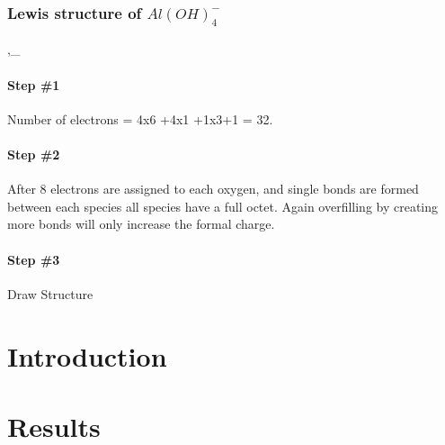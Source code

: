 \documentclass[]{article}
\let\oldparagraph\paragraph
\renewcommand{\paragraph}[1]{\oldparagraph{#1}\mbox{}}
\begin{document}
\hypertarget{lewis-structure-of-aloh_4--}{%
\subsubsection{\texorpdfstring{Lewis structure of
\(Al(OH)_4 ^{-}\)}{Lewis structure of Al(OH)\_4 \^{}\{-\}}}\label{lewis-structure-of-aloh_4--}}

,\_

\hypertarget{step-1-1}{%
\paragraph{Step \#1}\label{step-1-1}}

Number of electrons = 4x6 +4x1 +1x3+1 = 32.

\hypertarget{step-2-1}{%
\paragraph{Step \#2}\label{step-2-1}}

After 8 electrons are assigned to each oxygen, and single bonds are
formed between each species all species have a full octet. Again
overfilling by creating more bonds will only increase the formal charge.

\hypertarget{step-3-1}{%
\paragraph{Step \#3}\label{step-3-1}}

Draw Structure

\hypertarget{introduction}{%
\section{Introduction}\label{introduction}}

\hypertarget{results}{%
\section{Results}\label{results}}
\end{document}
